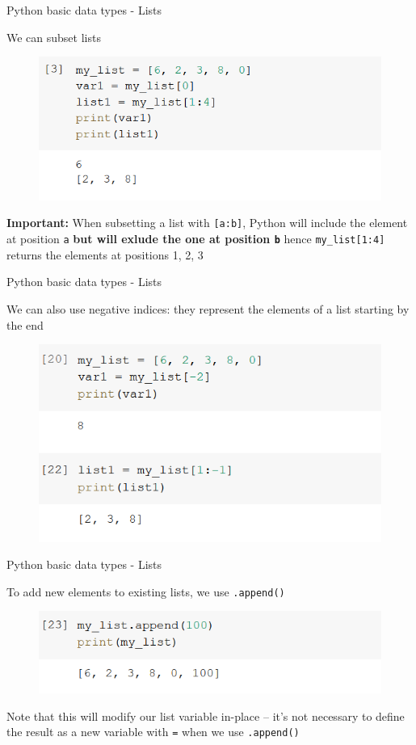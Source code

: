 \documentclass[aspectratio=169]{beamer}
\begin{document}
\begin{frame}{Python basic data types - Lists}

	We can subset lists

	\begin{figure}
		\centering
		\includegraphics[width=0.6\linewidth]{img/list_subset.png}
	\end{figure}

	\textbf{Important:} When subsetting a list with \texttt{[a:b]}, Python will include the element at position \texttt{a} \textbf{but will exlude the one at position \texttt{b}}
	\newline \scriptsize hence \texttt{my\_list[1:4]} returns the elements at positions 1, 2, 3 \normalsize

\end{frame}

\begin{frame}{Python basic data types - Lists}

	We can also use negative indices: they represent the elements of a list starting by the end

	\begin{figure}
		\centering
		\includegraphics[width=0.6\linewidth]{img/list_subset_negative.png}
	\end{figure}

\end{frame}

\begin{frame}{Python basic data types - Lists}

	To add new elements to existing lists, we use \texttt{.append()}

	\begin{figure}
		\centering
		\includegraphics[width=0.6\linewidth]{img/list_append.png}
	\end{figure}

	Note that this will modify our list variable in-place -- it's not necessary to define the result as a new variable with \texttt{=} when we use \texttt{.append()}

\end{frame}
\end{document}
